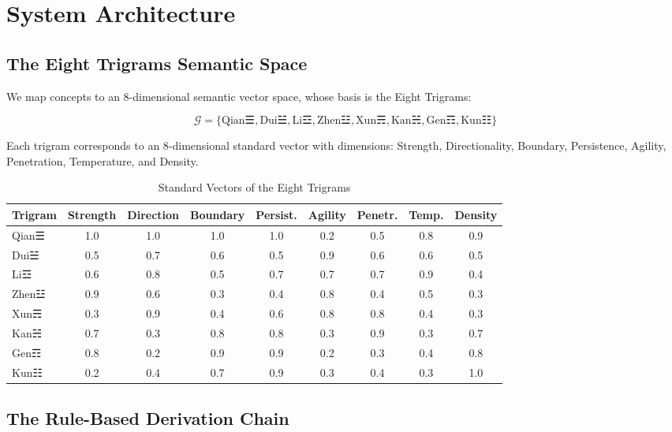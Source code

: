 \documentclass[11pt,a4paper]{article}
\begin{document}
\section{System Architecture}

\subsection{The Eight Trigrams Semantic Space}

We map concepts to an 8-dimensional semantic vector space, whose basis is the Eight Trigrams:

\[
\mathcal{G} = \{\text{Qian☰}, \text{Dui☱}, \text{Li☲}, \text{Zhen☳}, \text{Xun☴}, \text{Kan☵}, \text{Gen☶}, \text{Kun☷}\}
\]

Each trigram corresponds to an 8-dimensional standard vector with dimensions: Strength, Directionality, Boundary, Persistence, Agility, Penetration, Temperature, and Density.

\begin{table}[ht]
\centering
\caption{Standard Vectors of the Eight Trigrams}
\begin{tabular}{lcccccccc}
\toprule
Trigram & Strength & Direction & Boundary & Persist. & Agility & Penetr. & Temp. & Density \\
\midrule
Qian☰ & 1.0 & 1.0 & 1.0 & 1.0 & 0.2 & 0.5 & 0.8 & 0.9 \\
Dui☱  & 0.5 & 0.7 & 0.6 & 0.5 & 0.9 & 0.6 & 0.6 & 0.5 \\
Li☲   & 0.6 & 0.8 & 0.5 & 0.7 & 0.7 & 0.7 & 0.9 & 0.4 \\
Zhen☳ & 0.9 & 0.6 & 0.3 & 0.4 & 0.8 & 0.4 & 0.5 & 0.3 \\
Xun☴  & 0.3 & 0.9 & 0.4 & 0.6 & 0.8 & 0.8 & 0.4 & 0.3 \\
Kan☵  & 0.7 & 0.3 & 0.8 & 0.8 & 0.3 & 0.9 & 0.3 & 0.7 \\
Gen☶  & 0.8 & 0.2 & 0.9 & 0.9 & 0.2 & 0.3 & 0.4 & 0.8 \\
Kun☷  & 0.2 & 0.4 & 0.7 & 0.9 & 0.3 & 0.4 & 0.3 & 1.0 \\
\bottomrule
\end{tabular}
\end{table}

\subsection{The Rule-Based Derivation Chain}
\end{document}
